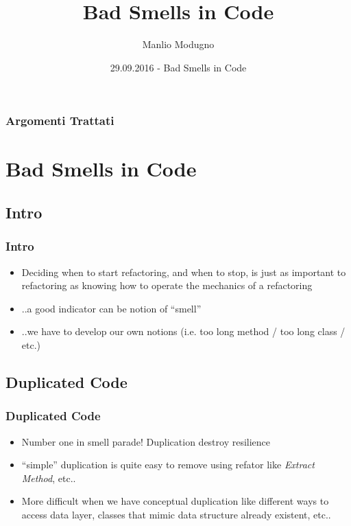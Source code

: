 \documentclass{beamer}
\title{Bad Smells in Code}
\author{Manlio Modugno}
\institute[GMTechnologies]
\date[29.09.2016] 
{29.09.2016 - Bad Smells in Code}
\begin{document}
\begin{frame}
  \titlepage
\end{frame}

\begin{frame}
  \frametitle{Argomenti Trattati}
  \tableofcontents
\end{frame}

\section{Bad Smells in Code}
\subsection{Intro}
\begin{frame}
  \frametitle{Intro}
  \begin{itemize}
	\item<+-> Deciding when to start refactoring, and when to stop, is just as important to refactoring as knowing how to operate the mechanics of a refactoring
	\item<+-> ..a good indicator can be notion of ``smell'' 
	\item<+-> ..we have to develop our own notions (i.e. too long method / too long class / etc.)
  \end{itemize}
\end{frame}

\subsection{Duplicated Code}
\begin{frame}
  \frametitle{Duplicated Code}
  \begin{itemize}
	\item<+-> Number one in smell parade! Duplication destroy resilience
	\item<+-> ``simple'' duplication is quite easy to remove using refator like \textit{Extract Method}, etc..
	\item<+-> More difficult when we have conceptual duplication like different ways to access data layer, classes that mimic data structure already existent, etc..
  \end{itemize}
\end{frame}
\end{document}
